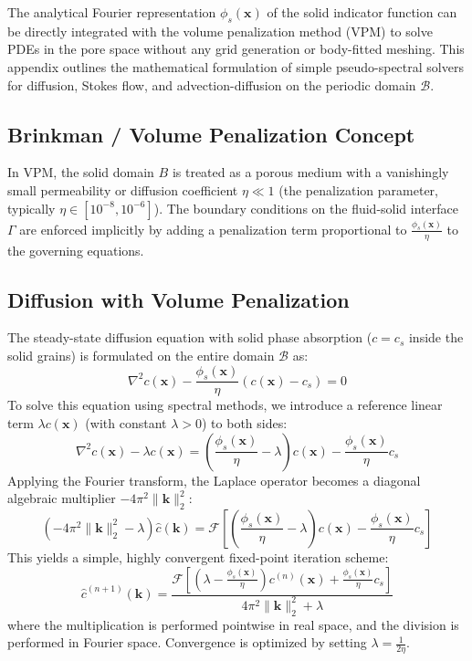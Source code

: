 \documentclass[preprint,12pt]{elsarticle}
\newcommand{\x}{\mathbf{x}}
\newcommand{\kvec}{\mathbf{k}}
\begin{document}
The analytical Fourier representation $\phi_s(\x)$ of the solid indicator function can be directly integrated with the volume penalization method (VPM) \citep{angot1999penalization} to solve PDEs in the pore space without any grid generation or body-fitted meshing. This appendix outlines the mathematical formulation of simple pseudo-spectral solvers for diffusion, Stokes flow, and advection-diffusion on the periodic domain $\mathcal{B}$.

\subsection{Brinkman / Volume Penalization Concept}
In VPM, the solid domain $B$ is treated as a porous medium with a vanishingly small permeability or diffusion coefficient $\eta \ll 1$ (the penalization parameter, typically $\eta \in [10^{-8}, 10^{-6}]$). The boundary conditions on the fluid-solid interface $\Gamma$ are enforced implicitly by adding a penalization term proportional to $\frac{\phi_s(\x)}{\eta}$ to the governing equations.

\subsection{Diffusion with Volume Penalization}
The steady-state diffusion equation with solid phase absorption ($c = c_s$ inside the solid grains) is formulated on the entire domain $\mathcal{B}$ as:
\begin{equation}
\nabla^2 c(\x) - \frac{\phi_s(\x)}{\eta} (c(\x) - c_s) = 0
\end{equation}
To solve this equation using spectral methods, we introduce a reference linear term $\lambda c(\x)$ (with constant $\lambda > 0$) to both sides:
\begin{equation}
\nabla^2 c(\x) - \lambda c(\x) = \left( \frac{\phi_s(\x)}{\eta} - \lambda \right) c(\x) - \frac{\phi_s(\x)}{\eta} c_s
\end{equation}
Applying the Fourier transform, the Laplace operator becomes a diagonal algebraic multiplier $-4\pi^2 \|\kvec\|_2^2$:
\begin{equation}
\left( -4\pi^2 \|\kvec\|_2^2 - \lambda \right) \widehat{c}(\kvec) = \mathcal{F}\left[ \left( \frac{\phi_s(\x)}{\eta} - \lambda \right) c(\x) - \frac{\phi_s(\x)}{\eta} c_s \right]
\end{equation}
This yields a simple, highly convergent fixed-point iteration scheme:
\begin{equation}
\label{eq:spectral_diff_iter}
\widehat{c}^{(n+1)}(\kvec) = \frac{\mathcal{F}\left[ \left( \lambda - \frac{\phi_s(\x)}{\eta} \right) c^{(n)}(\x) + \frac{\phi_s(\x)}{\eta} c_s \right]}{4\pi^2 \|\kvec\|_2^2 + \lambda}
\end{equation}
where the multiplication is performed pointwise in real space, and the division is performed in Fourier space. Convergence is optimized by setting $\lambda = \frac{1}{2\eta}$.
\end{document}
